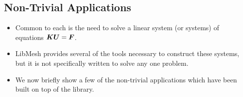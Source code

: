 \subsection*{Non-Trivial Applications}
\begin{frame}%
  \begin{itemize}%
  \item{Common to each is the need
    to solve a linear system
    (or systems) of equations ${\boldsymbol{K}} {\boldsymbol{U}} = {\boldsymbol{F}}$.}

  \item{LibMesh provides several of the tools necessary to construct
    these systems, but it is not specifically written to solve any one
    problem.}

  \item{We now briefly show a few of the non-trivial applications which have been built on
    top of the library.}
    

  \end{itemize}
\end{frame}	  
